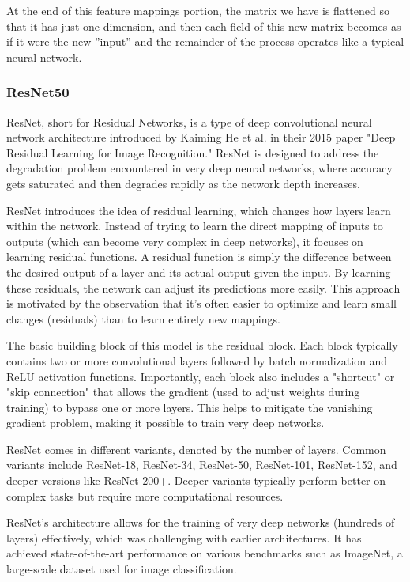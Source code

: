 \documentclass[conference]{IEEEtran}
\begin{document}
At the end of this feature mappings portion, the matrix we have is flattened so that it has just one dimension, and then each field of this new matrix becomes as if it were the new ”input” and the remainder of the process operates like a typical neural network.

\subsubsection{ResNet50}

ResNet, short for Residual Networks, is a type of deep convolutional neural network architecture introduced by Kaiming He et al. in their 2015 paper "Deep Residual Learning for Image Recognition." ResNet is designed to address the degradation problem encountered in very deep neural networks, where accuracy gets saturated and then degrades rapidly as the network depth increases.

ResNet introduces the idea of residual learning, which changes how layers learn within the network. Instead of trying to learn the direct mapping of inputs to outputs (which can become very complex in deep networks), it focuses on learning residual functions. A residual function is simply the difference between the desired output of a layer and its actual output given the input. By learning these residuals, the network can adjust its predictions more easily. This approach is motivated by the observation that it's often easier to optimize and learn small changes (residuals) than to learn entirely new mappings.

The basic building block of this model is the residual block. Each block typically contains two or more convolutional layers followed by batch normalization and ReLU activation functions. Importantly, each block also includes a "shortcut" or "skip connection" that allows the gradient (used to adjust weights during training) to bypass one or more layers. This helps to mitigate the vanishing gradient problem, making it possible to train very deep networks.

ResNet comes in different variants, denoted by the number of layers. Common variants include ResNet-18, ResNet-34, ResNet-50, ResNet-101, ResNet-152, and deeper versions like ResNet-200+. Deeper variants typically perform better on complex tasks but require more computational resources.

ResNet's architecture allows for the training of very deep networks (hundreds of layers) effectively, which was challenging with earlier architectures. It has achieved state-of-the-art performance on various benchmarks such as ImageNet, a large-scale dataset used for image classification.
\end{document}
